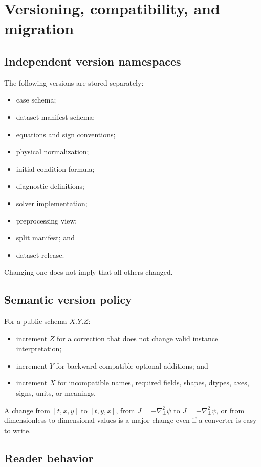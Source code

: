 \documentclass[11pt]{article}
\newcommand{\Lap}{\nabla_{\!\perp}^{2}}
\begin{document}
\section{Versioning, compatibility, and migration}
\label{sec:versioning}

\subsection{Independent version namespaces}

The following versions are stored separately:
\begin{itemize}
  \item case schema;
  \item dataset-manifest schema;
  \item equations and sign conventions;
  \item physical normalization;
  \item initial-condition formula;
  \item diagnostic definitions;
  \item solver implementation;
  \item preprocessing view;
  \item split manifest; and
  \item dataset release.
\end{itemize}
Changing one does not imply that all others changed.

\subsection{Semantic version policy}

For a public schema $X.Y.Z$:
\begin{itemize}
  \item increment $Z$ for a correction that does not change valid instance interpretation;
  \item increment $Y$ for backward-compatible optional additions; and
  \item increment $X$ for incompatible names, required fields, shapes, dtypes, axes, signs, units, or meanings.
\end{itemize}

A change from $[t,x,y]$ to $[t,y,x]$, from $J=-\Lap\psi$ to $J=+\Lap\psi$, or from dimensionless to dimensional values is a major change even if a converter is easy to write.

\subsection{Reader behavior}
\end{document}
